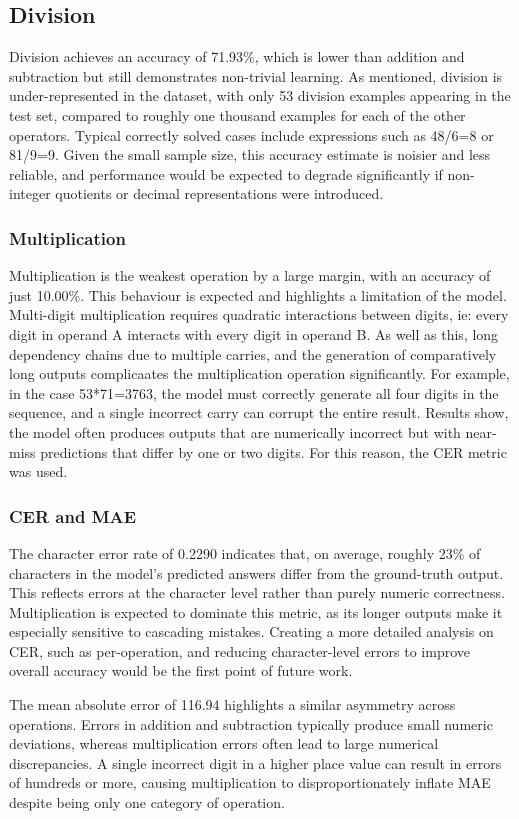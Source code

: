 \subsection{Division}
Division achieves an accuracy of 71.93\%, which is lower than addition and subtraction but still demonstrates non-trivial learning. As mentioned, division is under-represented in the dataset, with only 53 division examples appearing in the test set, compared to roughly one thousand examples for each of the other operators. Typical correctly solved cases include expressions such as 48/6=8 or 81/9=9. Given the small sample size, this accuracy estimate is noisier and less reliable, and performance would be expected to degrade significantly if non-integer quotients or decimal representations were introduced.

\subsubsection{Multiplication}
Multiplication is the weakest operation by a large margin, with an accuracy of just 10.00\%. This behaviour is expected and highlights a limitation of the model. Multi-digit multiplication requires quadratic interactions between digits, ie: every digit in operand A interacts with every digit in operand B. As well as this, long dependency chains due to multiple carries, and the generation of comparatively long outputs complicaates the multiplication operation significantly. For example, in the case 53*71=3763, the model must correctly generate all four digits in the sequence, and a single incorrect carry can corrupt the entire result. Results show, the model often produces outputs that are numerically incorrect but with near-miss predictions that differ by one or two digits. For this reason, the CER metric was used.

\subsubsection{CER and MAE}
The character error rate of 0.2290 indicates that, on average, roughly 23\% of characters in the model's predicted answers differ from the ground-truth output. This reflects errors at the character level rather than purely numeric correctness. Multiplication is expected to dominate this metric, as its longer outputs make it especially sensitive to cascading mistakes. Creating a more detailed analysis on CER, such as per-operation, and reducing character-level errors to improve overall accuracy would be the first point of future work.

The mean absolute error of 116.94 highlights a similar asymmetry across operations. Errors in addition and subtraction typically produce small numeric deviations, whereas multiplication errors often lead to large numerical discrepancies. A single incorrect digit in a higher place value can result in errors of hundreds or more, causing multiplication to disproportionately inflate MAE despite being only one category of operation.
